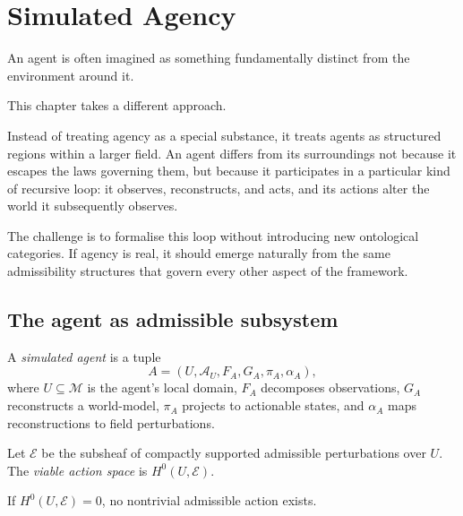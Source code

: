 
\chapter{Simulated Agency}
\label{ch:agency}


\begin{ChapterIntro}
An agent is often imagined as something fundamentally distinct from the environment around it.

This chapter takes a different approach.

Instead of treating agency as a special substance, it treats agents as structured regions within a larger field. An agent differs from its surroundings not because it escapes the laws governing them, but because it participates in a particular kind of recursive loop: it observes, reconstructs, and acts, and its actions alter the world it subsequently observes.

The challenge is to formalise this loop without introducing new ontological categories. If agency is real, it should emerge naturally from the same admissibility structures that govern every other aspect of the framework.
\end{ChapterIntro}

\section{The agent as admissible subsystem}

\begin{definition}[Agent]
  \label{def:agent}
  A \emph{simulated agent} is a tuple
  \[
    A = (U, \mathcal{A}_U, F_A, G_A, \pi_A, \alpha_A),
  \]
  where $U \subseteq \mathcal{M}$ is the agent's local domain,
  $F_A$ decomposes observations, $G_A$ reconstructs a
  world-model, $\pi_A$ projects to actionable states, and
  $\alpha_A$ maps reconstructions to field perturbations.
\end{definition}

\begin{definition}
  Let $\mathcal{E}$ be the subsheaf of compactly supported
  admissible perturbations over $U$.
  The \emph{viable action space} is $H^0(U, \mathcal{E})$.
\end{definition}

\begin{proposition}
  \label{prop:paralysis}
  \statusproven{}
  If $H^0(U, \mathcal{E}) = 0$, no nontrivial admissible
  action exists.
\end{proposition}

